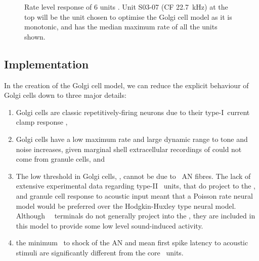 \smallskip{}

 \begin{figure}[htp!]
   \centering
  \caption[Rate level response of marginal shell units]{Rate level response of 6 units \citep[from
    Fig.~2]{GhoshalKim:1997}. Unit S03-07 (CF 22.7~kHz) at the top
    will be the unit chosen to optimise the Golgi cell model as it is
    monotonic, and has the median maximum rate of all the units
    shown.}\label{fig:GolgiKimFig2}
\end{figure}

\subsection{Implementation}\label{sec:Golgi:implementation}

In the creation of the Golgi cell model, we can reduce the explicit
behaviour of Golgi cells down to three major details:
 \begin{enumerate}
 \item Golgi cells are classic repetitively-firing neurons due to their
   type-I~current clamp response \citep{FerragamoGoldingEtAl:1998},
 \item Golgi cells have a low maximum rate and large dynamic range to tone and
   noise increases, given marginal shell extracellular recordings of
   \citet{GhoshalKim:1997} could not come from granule cells, and
 \item The low threshold in Golgi cells, \citet{GhoshalKim:1997}, cannot be due
   to \LSR~AN fibres. The lack of extensive experimental data regarding type-II
   \ANF~units, that do project to the \GCD, and granule cell response to
   acoustic input meant that a Poisson rate neural model would be preferred over
   the Hodgkin-Huxley type neural model.  Although \HSR~\ANF~terminals do not
   generally project into the \GCD, they are included in this model to provide
   some low level sound-induced activity.
 \item the minimum \EPSP~to shock of the AN \citep{FerragamoGoldingEtAl:1998}
   and mean first spike latency to acoustic stimuli \citep{GhoshalKim:1997} are
   significantly different from the core \VCN~units.
 \end{enumerate}

\smallskip{}


